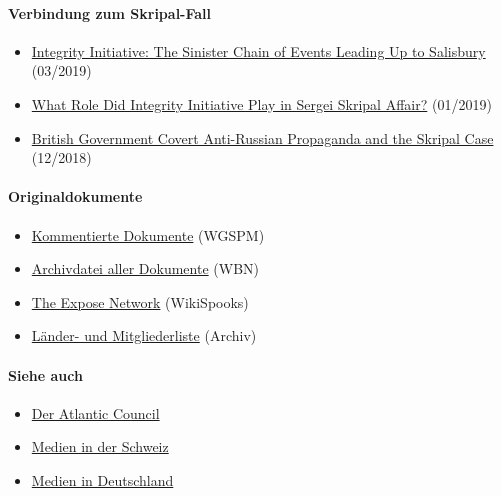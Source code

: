 \hypertarget{verbindung-zum-skripal-fall}{%
\paragraph{Verbindung zum
Skripal-Fall}\label{verbindung-zum-skripal-fall}}

\begin{itemize}
\tightlist
\item
  \href{https://sputniknews.com/world/201903041072947977-skripal-integrity-initiative-statecraft/}{Integrity
  Initiative: The Sinister Chain of Events Leading Up to Salisbury}
  (03/2019)
\item
  \href{https://sputniknews.com/europe/201901041071225427-skripal-integrity-initiative-miller/}{What
  Role Did Integrity Initiative Play in Sergei Skripal Affair?}
  (01/2019)
\item
  \href{https://www.craigmurray.org.uk/archives/2018/12/british-government-covert-anti-russian-propaganda-and-the-skripal-case/}{British
  Government Covert Anti-Russian Propaganda and the Skripal Case}
  (12/2018)
\end{itemize}

\hypertarget{originaldokumente}{%
\paragraph{Originaldokumente}\label{originaldokumente}}

\begin{itemize}
\tightlist
\item
  \href{http://syriapropagandamedia.org/working-papers/briefing-note-on-the-integrity-initiative\#acknowledgements}{Kommentierte
  Dokumente} (WGSPM)
\item
  \href{https://williambowlesnet.files.wordpress.com/2018/12/IntegrityInitiative.zip}{Archivdatei
  aller Dokumente} (WBN)
\item
  \href{https://wikispooks.com/wiki/EXPOSE_Network}{The Expose Network}
  (WikiSpooks)
\item
  \href{https://www.pdf-archive.com/2018/11/02/xcountry/xcountry.pdf}{Länder-
  und Mitgliederliste} (Archiv)
\end{itemize}

\hypertarget{siehe-auch}{%
\paragraph{Siehe auch}\label{siehe-auch}}

\begin{itemize}
\tightlist
\item
  \href{https://swprs.org/atlantic-council/}{Der Atlantic Council}
\item
  \href{https://swprs.org/netzwerk-medien-schweiz/}{Medien in der
  Schweiz}
\item
  \href{https://swprs.org/netzwerk-medien-deutschland/}{Medien in
  Deutschland}
\end{itemize}

